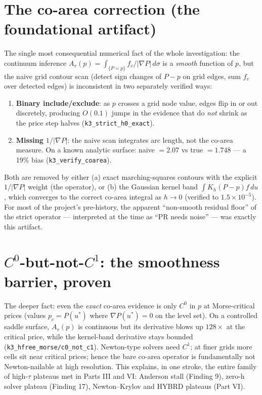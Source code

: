 \section{The co-area correction (the foundational artifact)}
The single most consequential numerical fact of the whole investigation:
the continuum inference $A_v(p) = \int_{\{P=p\}} f_v / |\nabla P|\,
d\sigma$ is a \emph{smooth} function of $p$, but the naive grid contour
scan (detect sign changes of $P - p$ on grid edges, sum $f_v$ over
detected edges) is inconsistent in two separately verified ways:
\begin{enumerate}\itemsep2pt
  \item \textbf{Binary include/exclude}: as $p$ crosses a grid node
        value, edges flip in or out discretely, producing $O(0.1)$
        jumps in the evidence that do \emph{not} shrink as the price
        step halves (\texttt{k3\_strict\_h0\_exact}).
  \item \textbf{Missing $1/|\nabla P|$}: the naive scan integrates
        arc length, not the co-area measure. On a known analytic
        surface: naive $= 2.07$ vs true $= 1.748$ --- a 19\% bias
        (\texttt{k3\_verify\_coarea}).
\end{enumerate}
Both are removed by either (a) exact marching-squares contours with the
explicit $1/|\nabla P|$ weight (the \strict{} operator), or (b) the
Gaussian kernel band $\int K_h(P - p) f\, du$, which converges to the
correct co-area integral as $h \to 0$ (verified to $1.5\times10^{-5}$).
For most of the project's pre-history, the apparent ``non-smooth
residual floor'' of the strict operator --- interpreted at the time as
``PR needs noise'' --- was exactly this artifact.

\section{$C^0$-but-not-$C^1$: the smoothness barrier, proven}
The deeper fact: even the \emph{exact} co-area evidence is only $C^0$ in
$p$ at Morse-critical prices (values $p_c = P(u^*)$ where
$\nabla P(u^*) = 0$ on the level set). On a controlled saddle surface,
$A_v(p)$ is continuous but its derivative blows up $128\times$ at the
critical price, while the kernel-band derivative stays bounded
(\texttt{k3\_hfree\_morse/c0\_not\_c1}). Newton-type solvers need
$C^1$; at finer grids more cells sit near critical prices; hence the
bare co-area operator is fundamentally not Newton-nailable at high
resolution. This explains, in one stroke, the entire family of
high-$\tau$ plateaus met in Parts III and VI: \strict{} Anderson stall
(Finding 9), zero-h solver plateau (Finding 17), Newton--Krylov and
HYBRD plateaus (Part VI).


